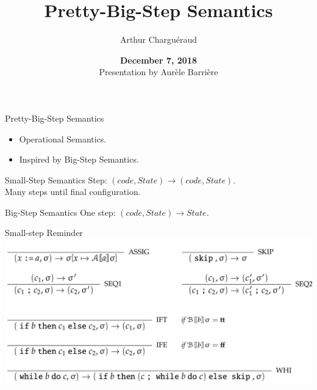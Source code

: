 \documentclass[page number,dvipsnames]{beamer}
\def\outline{
  \begin{frame}[plain,noframenumbering]
    \frametitle{Outline}
    \tableofcontents[currentsection]
  \end{frame}
}
\begin{document}
\title[Pretty Big Step]{Pretty-Big-Step Semantics}
\author{Arthur Chargu\'eraud}

\date{\textbf{December 7, 2018}\\
Presentation by Aur\`ele Barri\`ere}

\def\outline{
  \begin{frame}[plain,noframenumbering]
    \frametitle{Outline}
    \tableofcontents[currentsection]
  \end{frame}
}

\begin{frame}
  \vspace{-2cm}
  \maketitle
  \vspace{-4cm}
\end{frame}



\begin{frame}{Pretty-Big-Step Semantics}
  \begin{itemize}
  \item Operational Semantics.
  \item Inspired by Big-Step Semantics.
  \end{itemize}
  \vfill
  \begin{alertblock}{Small-Step Semantics}
    Step: $(\mathit{code},\mathit{State})\rightarrow(\mathit{code},\mathit{State})$.\\
    Many steps until final configuration.
  \end{alertblock}
  \vfill
  \begin{exampleblock}{Big-Step Semantics}
    One step: $(\mathit{code},\mathit{State})\rightarrow\mathit{State}$.
  \end{exampleblock}
  
\end{frame}

\begin{frame}{Small-step Reminder}
  \center
  \includegraphics[scale=0.2]{smallstep.png}
\end{frame}
\end{document}
